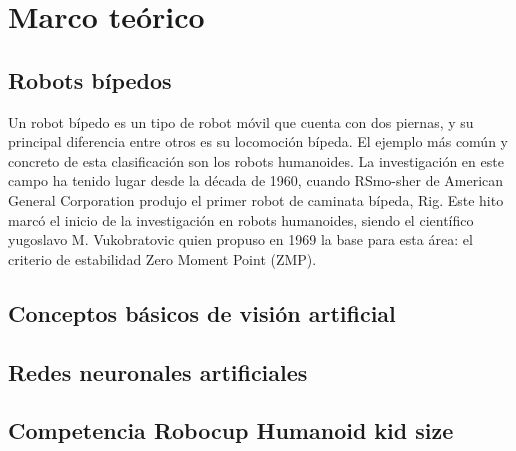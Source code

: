 \chapter{Marco teórico}
\section{Robots bípedos}
Un robot bípedo es un tipo de robot móvil que cuenta con dos piernas, y su principal diferencia entre otros es su locomoción bípeda. \cite{yang2017stateart} El ejemplo más común y concreto de esta clasificación son los robots humanoides. La investigación en este campo ha tenido lugar desde la década de 1960, cuando RSmo-sher de American General Corporation produjo el primer robot de caminata bípeda, Rig. Este hito marcó el inicio de la investigación en robots humanoides, siendo el científico yugoslavo M. Vukobratovic quien propuso en 1969 la base para esta área: el criterio de estabilidad Zero Moment Point (ZMP).\cite{chen2013walking}
\section{Conceptos básicos de visión artificial} 

\section{Redes neuronales artificiales}
    
\section{Competencia Robocup Humanoid kid size}
